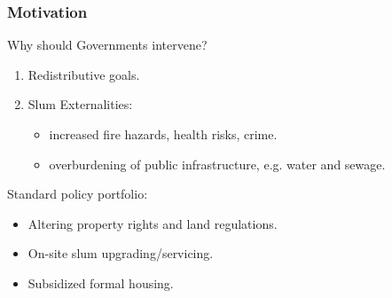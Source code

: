 \documentclass[aspectratio=149]{beamer}
\begin{document}

\begin{frame}
\frametitle{Motivation}

Why should Governments intervene? 

\begin{enumerate}
\item Redistributive goals. 
\vspace{1mm}
\item Slum Externalities:
  \begin{itemize}
    \item increased fire hazards, health risks, crime.
    \item overburdening of public infrastructure, e.g. water and sewage.

  \end{itemize}
\end{enumerate}

\vspace{2mm}

Standard policy portfolio:



\begin{itemize}
\item Altering property rights and land regulations.
\vspace{1mm}
\item On-site slum upgrading/servicing. 
\vspace{1mm}
\item Subsidized formal housing. 
\end{itemize}
\vspace{1mm}

\end{frame}

\end{document}
